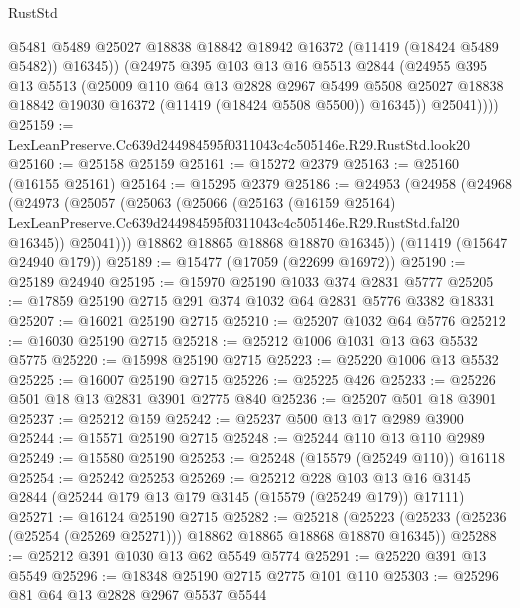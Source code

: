 \begin{lexlean}{RustStd}
\begin{coremodule}
              @5481
              @5489
              @25027
              @18838
              @18842
              @18942
              @16372
              (@11419 (@18424 @5489 @5482))
              @16345))
          (@24975
            @395
            @103
            @13
            @16
            @5513
            @2844
            (@24955
              @395
              @13
              @5513
              (@25009
                @110
                @64
                @13
                @2828
                @2967
                @5499
                @5508
                @25027
                @18838
                @18842
                @19030
                @16372
                (@11419 (@18424 @5508 @5500))
                @16345))
            @25041))))
@25159 := LexLeanPreserve.Cc639d244984595f0311043c4c505146e.R29.RustStd.look20
@25160 := @25158 @25159
@25161 := @15272 @2379
@25163 := @25160 (@16155 @25161)
@25164 := @15295 @2379
@25186 := @24953
    (@24958
      (@24968
        (@24973
          (@25057
            (@25063
              (@25066
                (@25163
                  (@16159 @25164)
                  LexLeanPreserve.Cc639d244984595f0311043c4c505146e.R29.RustStd.fal20
                  @16345))
              @25041)))
        @18862
        @18865
        @18868
        @18870
        @16345))
    (@11419 (@15647 @24940 @179))
@25189 := @15477 (@17059 (@22699 @16972))
@25190 := @25189 @24940
@25195 := @15970 @25190 @1033 @374 @2831 @5777
@25205 := @17859 @25190 @2715 @291 @374 @1032 @64 @2831 @5776 @3382 @18331
@25207 := @16021 @25190 @2715
@25210 := @25207 @1032 @64 @5776
@25212 := @16030 @25190 @2715
@25218 := @25212 @1006 @1031 @13 @63 @5532 @5775
@25220 := @15998 @25190 @2715
@25223 := @25220 @1006 @13 @5532
@25225 := @16007 @25190 @2715
@25226 := @25225 @426
@25233 := @25226 @501 @18 @13 @2831 @3901 @2775 @840
@25236 := @25207 @501 @18 @3901
@25237 := @25212 @159
@25242 := @25237 @500 @13 @17 @2989 @3900
@25244 := @15571 @25190 @2715
@25248 := @25244 @110 @13 @110 @2989
@25249 := @15580 @25190
@25253 := @25248 (@15579 (@25249 @110)) @16118
@25254 := @25242 @25253
@25269 := @25212
    @228
    @103
    @13
    @16
    @3145
    @2844
    (@25244 @179 @13 @179 @3145 (@15579 (@25249 @179)) @17111)
@25271 := @16124 @25190 @2715
@25282 := @25218
    (@25223 (@25233 (@25236 (@25254 (@25269 @25271))) @18862 @18865 @18868 @18870 @16345))
@25288 := @25212 @391 @1030 @13 @62 @5549 @5774
@25291 := @25220 @391 @13 @5549
@25296 := @18348 @25190 @2715 @2775 @101 @110
@25303 := @25296 @81 @64 @13 @2828 @2967 @5537 @5544

\end{coremodule}
\end{lexlean}
